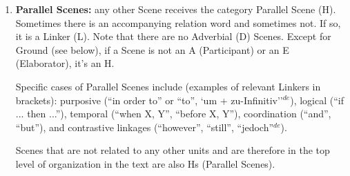 \documentclass[11pt]{article}
\newcommand{\german}[1]{{\color{red}#1$^{de}$}}
\newcommand{\dn}[1]{{\color{green}{#1}}}
\newcommand{\oa}[1]{{\color{blue}{OA: #1}}}
\newcommand{\nss}[1]{}
\newcommand{\rem}[1]{{(\it #1})}
\begin{document}
\begin{enumerate}
\item
  {\bf Parallel Scenes:} any other Scene receives the category Parallel Scene (H). Sometimes there
  is an accompanying relation word and sometimes not. If so, it is a Linker (L). Note that there are no Adverbial (D) Scenes.
  Except for Ground (see below), if a Scene is not an A (Participant) or an E (Elaborator), it's an H.


  Specific cases of Parallel Scenes include (examples of relevant Linkers in brackets): purposive (``in order to'' or ``to''\german{, `um + zu-Infinitiv''}), logical (``if ... then ...''), temporal (``when X, Y'', ``before X, Y''), coordination (``and'', ``but''), and contrastive linkages (``however'', ``still''\german{, ``jedoch''}).

Scenes that are not related to any other units and are therefore in the top level of organization in the text are also Hs (Parallel Scenes). 


\end{enumerate}
\end{document}
